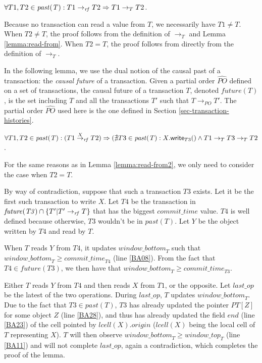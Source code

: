 \begin{lemma}
\label{lemma:read-from2}
$\forall T1, T2 \in \mathit{past(T)}: 
T1 \stackrel{}{\rightarrow}_{\mathit{rf}} T2 \Rightarrow T1 \rightarrow_T T2$.
\end{lemma}
\begin{proofL}
Because no transaction can read a value from $T$, we necessarily have 
$T1 \neq T$.
When $T2 \neq T$, the proof follows from the definition of
$\rightarrow_T$ and Lemma \ref{lemma:read-from}. When $T2 = T$, 
the proof follows from directly from the definition of $\rightarrow_T$.
\renewcommand{\toto}{lemma:read-from2}
\end{proofL}

In the following lemma, we use the dual notion of the causal past of a 
transaction:  the {\it  causal future} of a transaction. 
Given a partial order  $\widehat{PO}$ defined on  a set of transactions, the 
causal future  of a  transaction $T$,  denoted $future(T)$,  is  the set
including $T$ and all the transactions $T'$  such that 
$T \rightarrow_\mathit{PO} T'$. The partial order  $\widehat{PO}$ used here 
is the  one defined in Section \ref{sec-transaction-histories}.


\begin{lemma}
\label{lemma:legal2}
$\forall T1, T2 \in \mathit{past(T)}: (T1 \stackrel{X}{\rightarrow}_{\mathit{rf}} T2)
\Rightarrow (\nexists T3 \in \mathit{past(T)}: 
         X.{\sf write}_{T3}() \wedge T1 \rightarrow_T T3 \rightarrow_T T2$.
\end{lemma}
\begin{proofL}
For the same reasons as in Lemma \ref{lemma:read-from2}, we only need 
to consider the case when $T2 = T$.

By way of contradiction, suppose that such a transaction $T3$ exists.
Let it be the first such transaction to write $X$.
Let $T4$ be the transaction in $\mathit{future(T3)} \cap \{T'|T' \stackrel{}{\rightarrow}_{\mathit{rf}} T\}$ 
that has the biggest $\mathit{commit\_time}$ value. $T4$ is well defined 
because otherwise, $T3$ wouldn't be in $\mathit{past(T)}$. 
Let $Y$ be the object written by $T4$ and read by $T$.

When $T$ reads $Y$ from $T4$, it updates $\mathit{window\_bottom}_T$ such that
$\mathit{window\_bottom}_T \geq \mathit{commit\_time}_{T4}$ (line \ref{BA08}).
From the fact that $T4 \in \mathit{future(T3)}$, we then have that 
$\mathit{window\_bottom}_T \geq \mathit{commit\_time}_{T3}$.


Either $T$ reads $Y$ from $T4$ and then reads $X$ from $T1$, or the opposite.
Let $\mathit{last\_op}$ be the latest of the two operations.
During $\mathit{last\_op}$, $T$ updates $\mathit{window\_bottom}_T$.
Due to the fact that $T3 \in \mathit{past(T)}$, $T3$ has already updated
the pointer $PT[Z]$ for some object $Z$ (line \ref{BA28}), and thus has already
updated the field $end$ (line \ref{BA23}) of the cell pointed by 
$lcell(X).\mathit{origin}$ ($lcell(X)$ being the local cell of $T$
representing $X$). $T$ will then observe 
$\mathit{window\_bottom}_T \geq \mathit{window\_top}_T$ (line \ref{BA11})
and will not complete $\mathit{last\_op}$, again a contradiction, 
which completes the proof of the lemma.
\renewcommand{\toto}{lemma:legal2}
\end{proofL}

